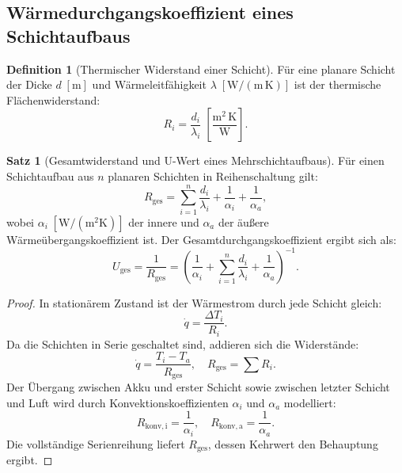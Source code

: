 ﻿\documentclass[a4paper,12pt]{article}
\theoremstyle{definition}
\newtheorem{definition}{Definition}
\newtheorem{satz}{Satz}
\begin{document}
\subsection{W\"armedurchgangskoeffizient eines Schichtaufbaus}

\begin{definition}[Thermischer Widerstand einer Schicht]
F\"ur eine planare Schicht der Dicke $d\;[\mathrm{m}]$ und W\"armeleitf\"ahigkeit $\lambda\;[\mathrm{W/(m\,K)}]$ ist der thermische Fl\"achenwiderstand:
\[
  R_i = \frac{d_i}{\lambda_i}\;\left[\frac{\mathrm{m^2\,K}}{\mathrm{W}}\right].
\]
\end{definition}

\begin{satz}[Gesamtwiderstand und U-Wert eines Mehrschichtaufbaus]
\label{satz:ugesamt}
F\"ur einen Schichtaufbau aus $n$ planaren Schichten in Reihenschaltung gilt:
\[
  R_\mathrm{ges} = \sum_{i=1}^{n} \frac{d_i}{\lambda_i} + \frac{1}{\alpha_i} + \frac{1}{\alpha_a},
\]
wobei $\alpha_i\;[\mathrm{W/(m^2 K)}]$ der innere und $\alpha_a$ der \"au\ss{}ere W\"arme\"ubergangskoeffizient ist. Der Gesamtdurchgangskoeffizient ergibt sich als:
\[
  \boxed{U_\mathrm{ges} = \frac{1}{R_\mathrm{ges}} = \left(\frac{1}{\alpha_i} + \sum_{i=1}^{n} \frac{d_i}{\lambda_i} + \frac{1}{\alpha_a}\right)^{-1}.}
\]
\end{satz}

\begin{proof}
In station\"arem Zustand ist der W\"armestrom durch jede Schicht gleich:
\[
  \dot{q} = \frac{\Delta T_i}{R_i}.
\]
Da die Schichten in Serie geschaltet sind, addieren sich die Widerst\"ande:
\[
  \dot{q} = \frac{T_i - T_a}{R_\mathrm{ges}}, \quad R_\mathrm{ges} = \sum R_i.
\]
Der \"Ubergang zwischen Akku und erster Schicht sowie zwischen letzter Schicht und Luft wird durch Konvektionskoeffizienten $\alpha_i$ und $\alpha_a$ modelliert:
\[
  R_\mathrm{konv,i} = \frac{1}{\alpha_i}, \quad R_\mathrm{konv,a} = \frac{1}{\alpha_a}.
\]
Die vollst\"andige Serienreihung liefert $R_\mathrm{ges}$, dessen Kehrwert den Behauptung ergibt.
\end{proof}
\end{document}

